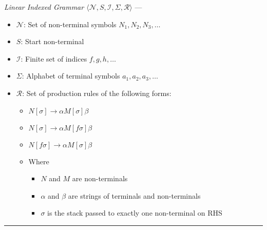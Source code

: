 \emph{Linear Indexed Grammar $\langle \mathcal{N}, S, \mathcal{I}, \Sigma, \mathcal{R} \rangle$} --- 
\begin{itemize}
    \item $\mathcal{N}$: Set of non-terminal symbols $N_1, N_2, N_3, \dots$
    \item $S$: Start non-terminal
    \item $\mathcal{I}$: Finite set of indices $f, g, h, \dots$
    \item $\Sigma$: Alphabet of terminal symbols $a_1, a_2, a_3, \dots$
    \item $\mathcal{R}$: Set of production rules of the following forms:
    \begin{itemize}
        \item $N[\sigma] \to \alpha M[\sigma]\beta$
        \item $N[\sigma] \to \alpha M[f\sigma]\beta$
        \item $N[f\sigma] \to \alpha M[\sigma]\beta$
        \item Where
        \begin{itemize}
            \item $N$ and $M$ are non-terminals
            \item $\alpha$ and $\beta$ are strings of terminals and non-terminals
            \item $\sigma$ is the stack passed to exactly one non-terminal on RHS
        \end{itemize}
    \end{itemize}
\end{itemize}

{\color{lightgray}\hrule height 0.001mm}

